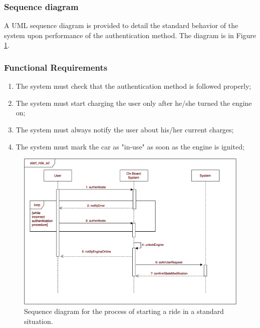 \subsubsection{Sequence diagram}
A UML sequence diagram is provided to detail the standard behavior of the system upon performance of the authentication method. The diagram is in Figure \ref{start_sd}.

\subsubsection{Functional Requirements}
\begin{enumerate}
\item The system must check that the authentication method is followed properly;
\item The system must start charging the user only after he/she turned the engine on;
\item The system must always notify the user about his/her current charges;
\item The system must mark the car as "in-use" as soon as the engine is ignited;
\end{enumerate}

\begin{figure}[H]
\begin{center}
		\includegraphics[width=\textwidth]{./specific_requirements/features/diagrams/start_ride_sd.png}
		\caption{Sequence diagram for the process of starting a ride in a standard situation.}
		\label{start_sd}
\end{center}
\end{figure}

